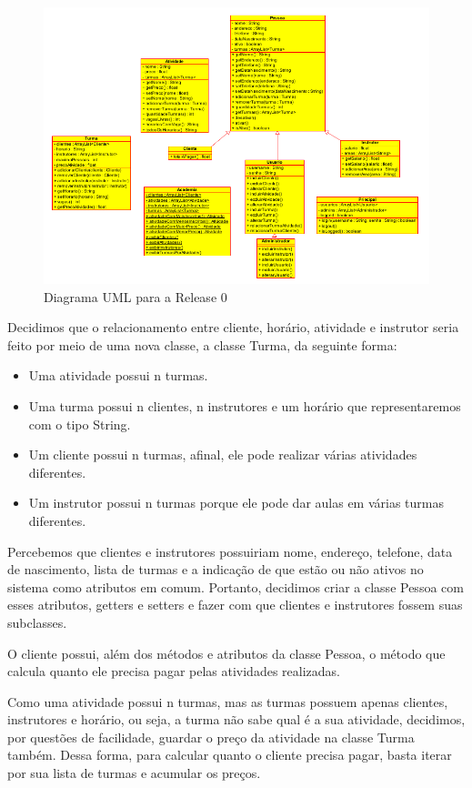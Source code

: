 \documentclass[11pt,twoside]{article}
\begin{document}
\begin{figure}[H]
\centering
\includegraphics[width=.75\textwidth]{uml0}
\caption{Diagrama UML para a Release 0}
\end{figure}

Decidimos que o relacionamento entre cliente, horário, atividade e instrutor seria feito por meio de uma nova classe, a classe
Turma, da seguinte forma:

\begin{itemize}
  \item Uma atividade possui n turmas.
  \item Uma turma possui n clientes, n instrutores e um horário que representaremos com o tipo String.
  \item Um cliente possui n turmas, afinal, ele pode realizar várias atividades diferentes.
  \item Um instrutor possui n turmas porque ele pode dar aulas em várias turmas diferentes.
\end{itemize}

Percebemos que clientes e instrutores possuiriam nome, endereço, telefone, data de nascimento, lista de turmas e a indicação
de que estão ou não ativos no sistema como atributos em comum. Portanto, decidimos criar a classe Pessoa com esses atributos, getters e
setters
e fazer com que clientes
e instrutores fossem suas subclasses.

O cliente possui, além dos métodos e atributos da classe Pessoa, o método que calcula quanto ele precisa pagar pelas atividades
realizadas.

Como uma atividade possui n turmas, mas as turmas possuem apenas clientes, instrutores e horário, ou seja, a turma não sabe
qual é a sua atividade, decidimos, por questões de facilidade, guardar o preço da atividade na classe Turma também. Dessa forma,
para calcular quanto o cliente precisa pagar, basta iterar por sua lista de turmas e acumular os preços.
\end{document}
